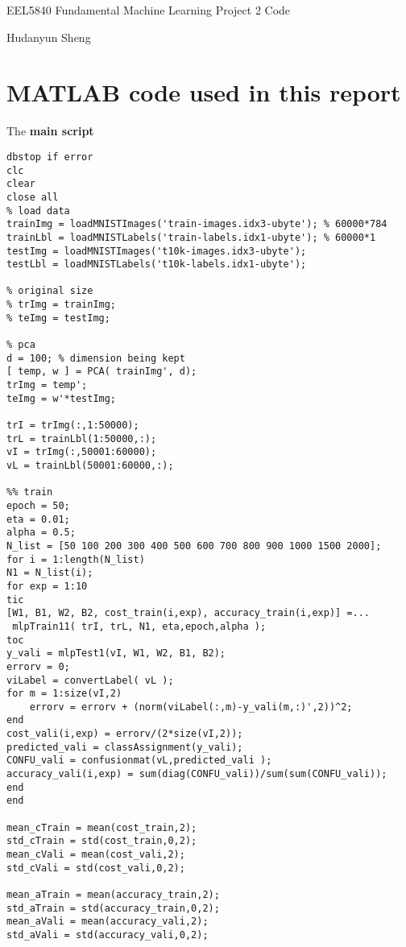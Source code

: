 \documentclass[a4paper]{article}
\begin{document}
\begin{spacing}{2.0}
\begin{flushleft}\begin{huge}EEL5840 Fundamental Machine Learning  Project 2 Code \end{huge}\end{flushleft}
\begin{flushright}\begin{Large} Hudanyun Sheng \end{Large}\end{flushright}

\section*{\huge\textbf{ MATLAB code used in this report }  }
\Large{The \textbf{main script} }
\normalsize
\begin{lstlisting}
dbstop if error
clc
clear
close all
% load data
trainImg = loadMNISTImages('train-images.idx3-ubyte'); % 60000*784
trainLbl = loadMNISTLabels('train-labels.idx1-ubyte'); % 60000*1
testImg = loadMNISTImages('t10k-images.idx3-ubyte');
testLbl = loadMNISTLabels('t10k-labels.idx1-ubyte');

% original size
% trImg = trainImg;
% teImg = testImg;

% pca
d = 100; % dimension being kept
[ temp, w ] = PCA( trainImg', d);
trImg = temp';
teImg = w'*testImg; 

trI = trImg(:,1:50000);
trL = trainLbl(1:50000,:);
vI = trImg(:,50001:60000);
vL = trainLbl(50001:60000,:);

%% train
epoch = 50;
eta = 0.01;
alpha = 0.5;
N_list = [50 100 200 300 400 500 600 700 800 900 1000 1500 2000];
for i = 1:length(N_list)
N1 = N_list(i);
for exp = 1:10
tic
[W1, B1, W2, B2, cost_train(i,exp), accuracy_train(i,exp)] =...
 mlpTrain11( trI, trL, N1, eta,epoch,alpha );
toc
y_vali = mlpTest1(vI, W1, W2, B1, B2);
errorv = 0;
viLabel = convertLabel( vL );
for m = 1:size(vI,2)
	errorv = errorv + (norm(viLabel(:,m)-y_vali(m,:)',2))^2;
end
cost_vali(i,exp) = errorv/(2*size(vI,2));
predicted_vali = classAssignment(y_vali);
CONFU_vali = confusionmat(vL,predicted_vali );
accuracy_vali(i,exp) = sum(diag(CONFU_vali))/sum(sum(CONFU_vali));
end
end   

mean_cTrain = mean(cost_train,2);
std_cTrain = std(cost_train,0,2);    
mean_cVali = mean(cost_vali,2);
std_cVali = std(cost_vali,0,2);    

mean_aTrain = mean(accuracy_train,2);
std_aTrain = std(accuracy_train,0,2);    
mean_aVali = mean(accuracy_vali,2);
std_aVali = std(accuracy_vali,0,2);    


\end{lstlisting}
\end{spacing}
\end{document}
